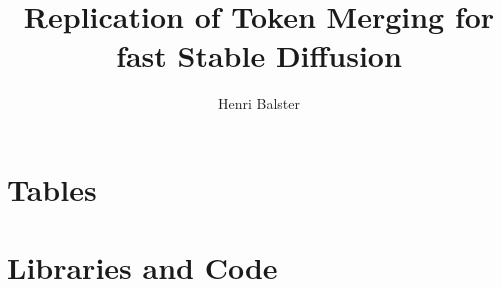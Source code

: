 \documentclass[12pt,a4paper]{article}
\title{Replication of Token Merging for fast Stable Diffusion}
\author{Henri Balster}
\date{}
\begin{document}

\newpage
\tableofcontents
\onehalfspacing
\newpage
{}








\newpage


\newpage


\newpage




\newpage
\appendix
{}
\section{Tables}


\newpage
\section{Libraries and Code}

\\


\newpage
\let\Section\section 
\def\section*#1{\Section{#1}} 


\end{document}

